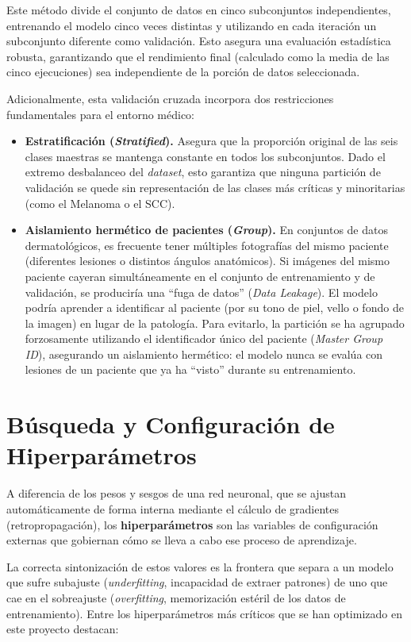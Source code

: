 Este método divide el conjunto de datos en cinco subconjuntos independientes, entrenando el modelo cinco veces distintas y utilizando en cada iteración un subconjunto diferente como validación. Esto asegura una evaluación estadística robusta, garantizando que el rendimiento final (calculado como la media de las cinco ejecuciones) sea independiente de la porción de datos seleccionada.

Adicionalmente, esta validación cruzada incorpora dos restricciones fundamentales para el entorno médico:

\begin{itemize}
	\item \textbf{Estratificación (\textit{Stratified}).} Asegura que la proporción original de las seis clases maestras se mantenga constante en todos los subconjuntos. Dado el extremo desbalanceo del \textit{dataset}, esto garantiza que ninguna partición de validación se quede sin representación de las clases más críticas y minoritarias (como el Melanoma o el SCC).
	
	\item \textbf{Aislamiento hermético de pacientes (\textit{Group}).} En conjuntos de datos dermatológicos, es frecuente tener múltiples fotografías del mismo paciente (diferentes lesiones o distintos ángulos anatómicos). Si imágenes del mismo paciente cayeran simultáneamente en el conjunto de entrenamiento y de validación, se produciría una ``fuga de datos'' (\textit{Data Leakage}). El modelo podría aprender a identificar al paciente (por su tono de piel, vello o fondo de la imagen) en lugar de la patología. Para evitarlo, la partición se ha agrupado forzosamente utilizando el identificador único del paciente (\textit{Master Group ID}), asegurando un aislamiento hermético: el modelo nunca se evalúa con lesiones de un paciente que ya ha ``visto'' durante su entrenamiento.
\end{itemize}


\section{Búsqueda y Configuración de Hiperparámetros}

A diferencia de los pesos y sesgos de una red neuronal, que se ajustan automáticamente de forma interna mediante el cálculo de gradientes (retropropagación), los \textbf{hiperparámetros} son las variables de configuración externas que gobiernan cómo se lleva a cabo ese proceso de aprendizaje.

La correcta sintonización de estos valores es la frontera que separa a un modelo que sufre subajuste (\textit{underfitting}, incapacidad de extraer patrones) de uno que cae en el sobreajuste (\textit{overfitting}, memorización estéril de los datos de entrenamiento). Entre los hiperparámetros más críticos que se han optimizado en este proyecto destacan:

